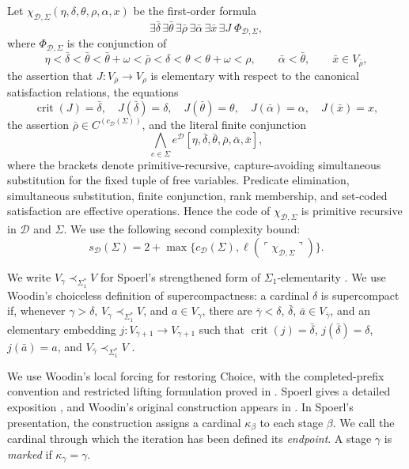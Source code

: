 \documentclass[11pt,a4paper]{amsart}
\DeclareRobustCommand{\revision}[1]{#1}
\newcommand{\crit}{\operatorname{crit}}
\theoremstyle{plain}
\theoremstyle{definition}
\theoremstyle{remark}
\begin{document}
Let $\chi_{\mathcal D,\Sigma}(\eta,\delta,\theta,\rho,\alpha,x)$ be the first-order formula
\[
\exists\bar\delta\,\exists\bar\theta\,\exists\bar\rho\,
\exists\bar\alpha\,\exists\bar x\,\exists J\;\Phi_{\mathcal D,\Sigma},
\]
where $\Phi_{\mathcal D,\Sigma}$ is the conjunction of
\[
\eta<\bar\delta<\bar\theta<\bar\theta+\omega<\bar\rho<
\delta<\theta<\theta+\omega<\rho,\qquad
\bar\alpha<\bar\theta,\qquad \bar x\in V_{\bar\rho},
\]
the assertion that $J:V_{\bar\rho}\to V_\rho$ is elementary with respect to the canonical satisfaction relations, the equations
\[
\crit(J)=\bar\delta,\quad J(\bar\delta)=\delta,\quad
J(\bar\theta)=\theta,\quad J(\bar\alpha)=\alpha,\quad J(\bar x)=x,
\]
the assertion $\bar\rho\in C^{(c_{\mathcal D}(\Sigma))}$, and the literal finite conjunction
\[
\bigwedge_{e\in\Sigma}
e^{\mathcal D}
[\eta,\bar\delta,\bar\theta,\bar\rho,\bar\alpha,\bar x],
\]
where the brackets denote primitive-recursive, capture-avoiding simultaneous substitution for the fixed tuple of free variables.  Predicate elimination, simultaneous substitution, finite conjunction, rank membership, and set-coded satisfaction are effective operations.  Hence the code of $\chi_{\mathcal D,\Sigma}$ is primitive recursive in $\mathcal D$ and $\Sigma$.  We use the following second complexity bound:
\[
s_{\mathcal D}(\Sigma)=2+\max\bigl\{c_{\mathcal D}(\Sigma),
\ell(\ulcorner\chi_{\mathcal D,\Sigma}\urcorner)\bigr\}.
\]
\endgroup

We write $V_\gamma\prec_{\Sigma_1^*}V$ for Spoerl's strengthened form of $\Sigma_1$-elementarity \cite[Definition~20]{Spoerl}.  We use Woodin's choiceless definition of supercompactness: a cardinal $\delta$ is supercompact if, whenever $\gamma>\delta$, $V_\gamma\prec_{\Sigma_1^*}V$, and $a\in V_\gamma$, there are $\bar\gamma<\delta$, $\bar\delta$, $\bar a\in V_{\bar\gamma}$, and an elementary embedding $j:V_{\bar\gamma+1}\to V_{\gamma+1}$ such that $\crit(j)=\bar\delta$, $j(\bar\delta)=\delta$, $j(\bar a)=a$, and $V_{\bar\gamma}\prec_{\Sigma_1^*}V$ \cite[Definition~21]{Spoerl}.

We use Woodin's local forcing for restoring Choice, with the completed-prefix convention and restricted lifting formulation proved in \cite[Section~3]{Supplement}.  Spoerl gives a detailed exposition {\cite[Definition~43, \revision{Theorem~44}, and Lemma~45]{Spoerl}}, and Woodin's original construction appears in \cite[pp.~323--324]{Woodin}.  In Spoerl's presentation, the construction assigns a cardinal $\kappa_\beta$ to each stage $\beta$.  We call the cardinal through which the iteration has been defined its \emph{endpoint}.  A stage $\gamma$ is \emph{marked} if $\kappa_\gamma=\gamma$.
\end{document}
